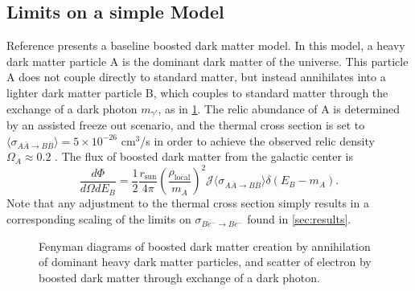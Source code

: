 \subsection{Limits on a simple Model}
\label{sec:limits_simple_model}
Reference \cite{Agashe:2014yua} presents a baseline boosted dark matter model.  In this model, a heavy dark matter particle A is the dominant dark matter of the universe.  This particle A does not couple directly to standard matter, but instead annihilates into a lighter dark matter particle B, which couples to standard matter through the exchange of a dark photon $m_{\gamma '}$, as in \cref{fig:feyn}.  The relic abundance of A is determined by an assisted freeze out scenario, and the thermal cross section is set to $\langle \sigma_{A\bar{A} \rightarrow B\bar{B}} \rangle=5 \times 10^{-26}$ cm$^3$/s in order to achieve the observed relic density $\Omega_A \approx 0.2$ \cite{Agashe:2014yua}.  The flux of boosted dark matter from the galactic center is 
\begin{equation}
\frac{d\Phi}{d\Omega dE_B}=\frac{1}{2}\frac{r_\textrm{sun}}{4\pi} \left(\frac{\rho_\textrm{local}}{m_A}\right)^2\mathcal{J}\langle \sigma_{A\bar{A} \rightarrow B\bar{B}} \rangle\delta(E_B-m_A).
\label{eq:flux}
\end{equation}
Note that any adjustment to the thermal cross section simply results in a corresponding scaling of the limits on $\sigma_{Be^- \rightarrow Be^-}$ found in \cref{sec:results}.  


\begin{figure}

\centering
{}
\caption{Fenyman diagrams of boosted dark matter creation by annihilation of dominant heavy dark matter particles, and scatter of electron by boosted dark matter through exchange of a dark photon.}
\label{fig:feyn}
\end{figure}


